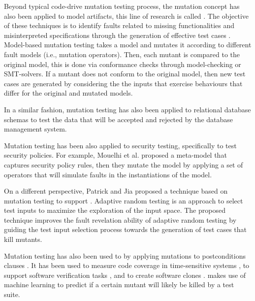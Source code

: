 
Beyond typical code-drive mutation testing process, the mutation concept has also been applied to model artifacts, this line of research is called . The objective of these techniques is to identify faults related to missing functionalities and misinterpreted specifications through the generation of effective test cases \cite{devroey2016featured,belli2016model}.
Model-based mutation testing takes a model and mutates it according to different fault models (i.e., mutation operators). Then, each mutant is compared to the original model, this is done via conformance checks through model-checking or SMT-solvers. If a mutant does not conform to the original model, then new test cases are generated by considering the the inputs that exercise behaviours that differ for the original and mutated models\cite{8411732}.

In a similar fashion, mutation testing has also been applied to relational database schemas \cite{wright2013efficient} to test the data that will be accepted and rejected by the database management system.


Mutation testing has been also applied to security testing, specifically to test security policies. For example, Mouelhi et al. \cite{mouelhiv2008generic} proposed a meta-model that captures security policy rules, then they mutate the model by applying a set of operators that will simulate faults in the instantiations of the model. 

On a different perspective, Patrick and Jia \cite{patrick2015kernel} proposed a technique based on mutation testing to support .
Adaptive random testing is an approach to select test inputs to maximize the exploration of the input space.
The proposed technique improves the fault revelation ability of adaptive random testing by guiding the test input selection process towards the generation of test cases that kill mutants.

Mutation testing has also been used to  by applying mutations to postconditions clauses \cite{galeotti2015inferring}. It has been used to measure code coverage in time-sensitive systems \cite{pankumhang2015iterative}, to support software verification tasks \cite{groce2015verified}, and to create software clones \cite{roy2009mutation}.  \cite{zhang2018predictive} makes use of machine learning to predict if a certain mutant will likely be killed by a test suite.

